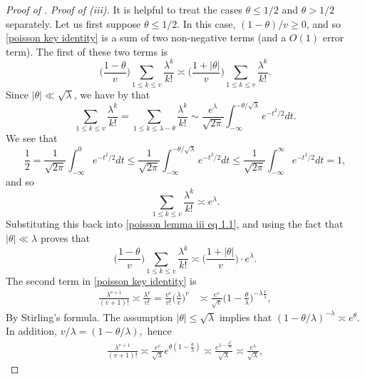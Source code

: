 \documentclass{amsart}
\theoremstyle{definition}
\numberwithin{equation}{section}
\begin{document}
\begin{proof}[Proof of ]
	\medskip\noindent\textit{Proof of (iii).} It is helpful to treat the cases $\theta \leq 1/2$ and $\theta > 1/2$ separately. Let us first suppose $\theta \leq 1/2$. In this case, $(1-\theta)/v \geq 0$, and so \eqref{poisson key identity} is a sum of two non-negative terms (and a $O(1)$ error term). The first of these two terms is 
	\begin{equation}\label{poisson lemma iii eq 1.1}
		\bigg(\frac{1-\theta}{v}\bigg) \sum_{1 \leq k \leq v} \frac{\lambda^k}{k!} \asymp \bigg(\frac{1+|\theta|}{v}\bigg)\sum_{1 \leq k \leq v} \frac{\lambda^k}{k!}.
	\end{equation}
	Since $|\theta |\ll \sqrt{\lambda}$, we have by  that
	$$\sum_{1 \leq k \leq v} \frac{\lambda^k}{k!} =\sum_{1 \leq k \leq \lambda - \theta} \frac{\lambda^k}{k!} \sim \frac{e^{\lambda}}{\sqrt{2 \pi}}\int_{- \infty}^{-\theta/\sqrt{\lambda}} e^{-t^2/2}dt.$$
	We see that \begin{equation*}
		\frac{1}{2} = \frac{1}{\sqrt{2 \pi}}\int_{- \infty}^{0} e^{-t^2/2}dt \leq \frac{1}{\sqrt{2 \pi}}\int_{- \infty}^{-\theta/\sqrt{\lambda}} e^{-t^2/2}dt \leq \frac{1}{\sqrt{2 \pi}}\int_{- \infty}^{\infty} e^{-t^2/2}dt = 1,
	\end{equation*}
	and so
	$$\sum_{1 \leq k \leq v} \frac{\lambda^k}{k!} \asymp e^\lambda.$$ Substituting this back into \eqref{poisson lemma iii eq 1.1}, and using the fact that $|\theta| \ll \lambda$ proves that 
	\begin{equation}
		\label{eq: poisson 11}
		\bigg(\frac{1-\theta}{v}\bigg) \sum_{1 \leq k \leq v} \frac{\lambda^k}{k!} \asymp \bigg(\frac{1+|\theta|}{v}\bigg) \cdot e^\lambda.
	\end{equation}
	The second term in \eqref{poisson key identity} is
	\begin{align}
		\frac{\lambda^{v+1}}{(v+1)!} \asymp \frac{\lambda^{v}}{v!} = \frac{v^v}{v!}\bigg(\frac{\lambda}{v}\bigg)^v &\asymp \frac{e^v}{\sqrt{v}}\bigg(1-\frac{\theta}{\lambda}\bigg)^{-\lambda \frac{v}{\lambda}},\nonumber
	\end{align}
	By Stirling's formula. The assumption $|\theta| \le \sqrt{\lambda}$ implies that $(1-\theta/\lambda)^{-\lambda} \asymp e^\theta$. In addition, $v/\lambda = (1-\theta/\lambda),$ hence
	\begin{align}\label{poisson lemma iii eq 2}
		\frac{\lambda^{v+1}}{(v+1)!} \asymp \frac{e^v}{\sqrt{\lambda}}e^{\theta(1-\frac{\theta}{\lambda})} \asymp \frac{e^{\lambda - \frac{\theta^2}{\lambda}}}{\sqrt{\lambda}} \asymp \frac{e^{\lambda}}{\sqrt{\lambda}},

\end{align}
\end{proof}
\end{document}

